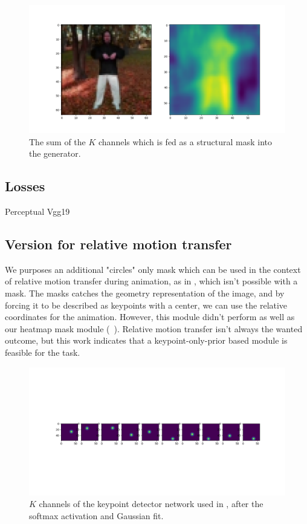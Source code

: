 \documentclass{article}
\begin{document}
\begin{figure}[ht]
\vskip 0.2in
\begin{center}
\centerline{\includegraphics[width=\columnwidth]{mask_sum}}
\caption{
The sum of the $K$ channels which is fed as a structural mask into the
generator.
}
\label{mask-sum}
\end{center}
\vskip -0.2in
\end{figure}


\subsection{Losses}
Perceptual Vgg19
\subsection{Version for relative motion transfer}
We purposes an additional "circles" only mask
which can be used in the context
of relative motion transfer during animation, as in
\cite{siarohin2020order}, which isn't possible with a mask.
The masks catches the geometry representation \cite{wu2019transgaga} of the
image, and by forcing it to be described as keypoints with a center, we can
use the relative coordinates for the animation. However, this module didn't
perform as well as our heatmap mask module (~\label{table:results}).
Relative motion transfer isn't always the wanted outcome, but this work
indicates that a keypoint-only-prior based module is feasible for the task.


\begin{figure}[ht]
\vskip 0.2in
\begin{center}
\centerline{\includegraphics[width=\columnwidth]{softmax_10kp}}
\caption{
$K$ channels of the keypoint detector network used in
\cite{siarohin2020order}, after the softmax activation and Gaussian fit.
}
\label{softmax-10kp}
\end{center}
\vskip -0.2in
\end{figure}
\end{document}
